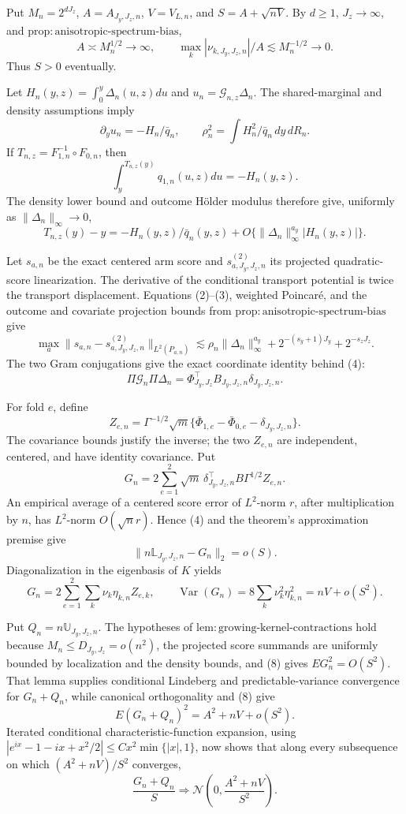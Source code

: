 Put \(M_n=2^{dJ_z}\), \(A=A_{J_y,J_z,n}\), \(V=V_{L,n}\), and \(S=A+\sqrt{nV}\).  By \(d\ge1\), \(J_z\to\infty\), and \(\mathrm{prop{:}anisotropic\text{-}spectrum\text{-}bias}\),
\[
A\asymp M_n^{1/2}\to\infty,
\qquad \max_k|\nu_{k,J_y,J_z,n}|/A\lesssim M_n^{-1/2}\to0. \tag{1}
\]
Thus \(S>0\) eventually.

Let \(H_n(y,z)=\int_0^y\Delta_n(u,z)du\) and \(u_n=\mathcal G_{n,z}\Delta_n\).  The shared-marginal and density assumptions imply
\[
\partial_yu_n=-H_n/\bar q_n,
\qquad \rho_n^2=\int H_n^2/\bar q_n\,dy\,dR_n. \tag{2}
\]
If \(T_{n,z}=F_{1,n}^{-1}\circ F_{0,n}\), then
\[
\int_y^{T_{n,z}(y)}q_{1,n}(u,z)du=-H_n(y,z).
\]
The density lower bound and outcome H\"older modulus therefore give, uniformly as \(\|\Delta_n\|_\infty\to0\),
\[
T_{n,z}(y)-y=-H_n(y,z)/\bar q_n(y,z)
+O\{\|\Delta_n\|_\infty^{a_y}|H_n(y,z)|\}. \tag{3}
\]

Let \(s_{a,n}\) be the exact centered arm score and \(s^{(2)}_{a,J_y,J_z,n}\) its projected quadratic-score linearization.  The derivative of the conditional transport potential is twice the transport displacement.  Equations (2)--(3), weighted Poincar\'e, and the outcome and covariate projection bounds from \(\mathrm{prop{:}anisotropic\text{-}spectrum\text{-}bias}\) give
\[
\max_a\|s_{a,n}-s^{(2)}_{a,J_y,J_z,n}\|_{L^2(P_{a,n})}
\lesssim\rho_n\|\Delta_n\|_\infty^{a_y}
+2^{-(s_y+1)J_y}+2^{-s_zJ_z}. \tag{4}
\]
The two Gram conjugations give the exact coordinate identity behind (4):
\[
\Pi\mathcal G_n\Pi\Delta_n
=\Phi_{J_y,J_z}^{\top}B_{J_y,J_z,n}\delta_{J_y,J_z,n}. \tag{5}
\]

For fold \(e\), define
\[
Z_{e,n}=\Gamma^{-1/2}\sqrt m
\{\bar\Phi_{1,e}-\bar\Phi_{0,e}-\delta_{J_y,J_z,n}\}.
\]
The covariance bounds justify the inverse; the two \(Z_{e,n}\) are independent, centered, and have identity covariance.  Put
\[
G_n=2\sum_{e=1}^2\sqrt m\,
\delta_{J_y,J_z,n}^{\top}B\Gamma^{1/2}Z_{e,n}. \tag{6}
\]
An empirical average of a centered score error of \(L^2\)-norm \(r\), after multiplication by \(n\), has \(L^2\)-norm \(O(\sqrt n r)\).  Hence (4) and the theorem's approximation premise give
\[
\|n\mathbb L_{J_y,J_z,n}-G_n\|_2=o(S). \tag{7}
\]
Diagonalization in the eigenbasis of \(K\) yields
\[
G_n=2\sum_{e=1}^2\sum_k\nu_k\eta_{k,n}Z_{e,k},
\qquad
\operatorname{Var}(G_n)=8\sum_k\nu_k^2\eta_{k,n}^2
=nV+o(S^2). \tag{8}
\]

Put \(Q_n=n\mathbb U_{J_y,J_z,n}\).  The hypotheses of \(\mathrm{lem{:}growing\text{-}kernel\text{-}contractions}\) hold because \(M_n\le D_{J_y,J_z}=o(n^2)\), the projected score summands are uniformly bounded by localization and the density bounds, and (8) gives \(EG_n^2=O(S^2)\).  That lemma supplies conditional Lindeberg and predictable-variance convergence for \(G_n+Q_n\), while canonical orthogonality and (8) give
\[
E(G_n+Q_n)^2=A^2+nV+o(S^2). \tag{9}
\]
Iterated conditional characteristic-function expansion, using
\(|e^{ix}-1-ix+x^2/2|\le Cx^2\min\{|x|,1\}\), now shows that along every subsequence on which \((A^2+nV)/S^2\) converges,
\[
\frac{G_n+Q_n}{S}\Rightarrow
\mathcal N\!\left(0,\frac{A^2+nV}{S^2}\right). \tag{10}
\]

